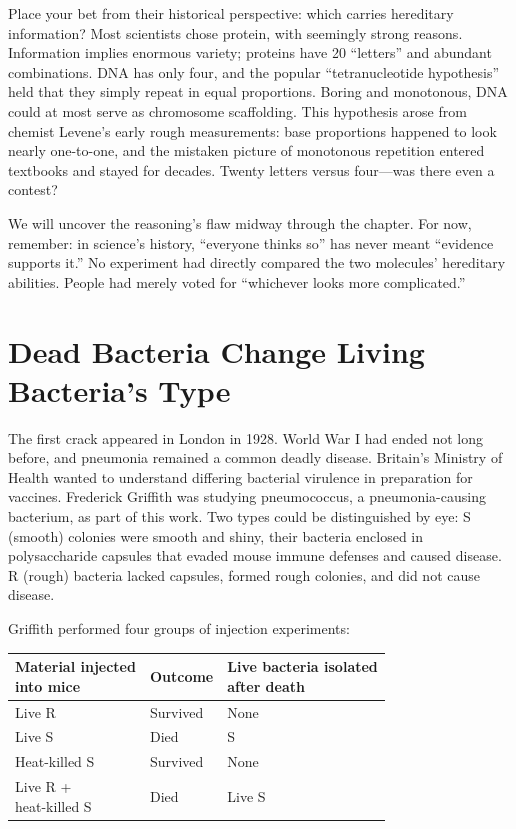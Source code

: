 Place your bet from their historical perspective: which carries hereditary information? Most scientists chose protein, with seemingly strong reasons. Information implies enormous variety; proteins have 20 ``letters'' and abundant combinations. DNA has only four, and the popular ``tetranucleotide hypothesis'' held that they simply repeat in equal proportions. Boring and monotonous, DNA could at most serve as chromosome scaffolding. This hypothesis arose from chemist Levene's early rough measurements: base proportions happened to look nearly one-to-one, and the mistaken picture of monotonous repetition entered textbooks and stayed for decades. Twenty letters versus four---was there even a contest?

We will uncover the reasoning's flaw midway through the chapter. For now, remember: in science's history, ``everyone thinks so'' has never meant ``evidence supports it.'' No experiment had directly compared the two molecules' hereditary abilities. People had merely voted for ``whichever looks more complicated.''

\section{Dead Bacteria Change Living Bacteria's Type}

The first crack appeared in London in 1928. World War I had ended not long before, and pneumonia remained a common deadly disease. Britain's Ministry of Health wanted to understand differing bacterial virulence in preparation for vaccines. Frederick Griffith was studying pneumococcus, a pneumonia-causing bacterium, as part of this work. Two types could be distinguished by eye: S (smooth) colonies were smooth and shiny, their bacteria enclosed in polysaccharide capsules that evaded mouse immune defenses and caused disease. R (rough) bacteria lacked capsules, formed rough colonies, and did not cause disease.

Griffith performed four groups of injection experiments:

\begin{table}[htbp]
\centering
\begin{tabular}{lll}
\toprule
\shortstack[l]{Material injected\\into mice} & Outcome & \shortstack[l]{Live bacteria isolated\\after death} \\
\midrule
Live R & Survived & None \\
Live S & Died & S \\
Heat-killed S & Survived & None \\
\shortstack[l]{Live R +\\heat-killed S} & Died & Live S \\
\bottomrule
\end{tabular}
\end{table}

